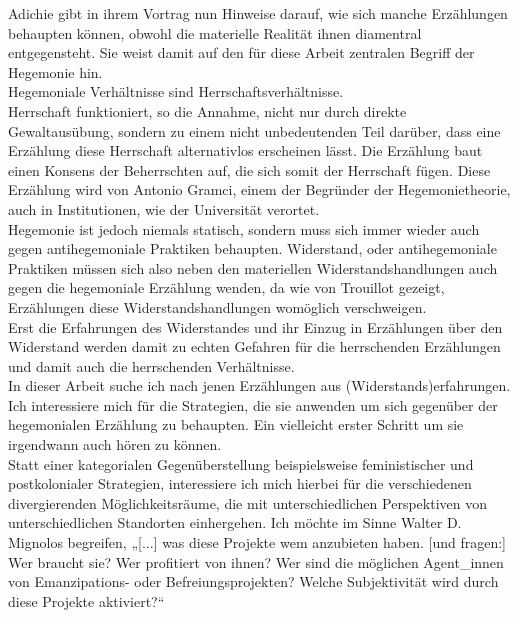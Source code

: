 Adichie gibt in ihrem Vortrag nun Hinweise darauf, wie sich manche
Erzählungen behaupten können, obwohl die materielle Realität ihnen diamentral
entgegensteht. Sie weist damit auf den für diese Arbeit zentralen Begriff der
Hegemonie hin.\\
Hegemoniale Verhältnisse sind
Herrschaftsverhältnisse.\footnotemark{}\\
Herrschaft
funktioniert, so die Annahme, nicht nur durch direkte Gewaltausübung, sondern
zu einem nicht unbedeutenden Teil darüber, dass eine Erzählung diese Herrschaft
alternativlos erscheinen lässt. Die Erzählung baut einen Konsens der
Beherrschten auf, die sich somit der Herrschaft fügen. Diese Erzählung wird von
Antonio Gramci, einem der Begründer der Hegemonietheorie, auch in
Institutionen, wie der Universität verortet.\\
Hegemonie ist jedoch niemals statisch, sondern muss sich immer wieder auch
gegen antihegemoniale Praktiken behaupten. Widerstand, oder antihegemoniale
Praktiken müssen sich also neben den materiellen Widerstandshandlungen auch
gegen die hegemoniale Erzählung wenden, da wie von Trouillot gezeigt,
Erzählungen diese Widerstandshandlungen womöglich verschweigen.\\
Erst die
Erfahrungen des Widerstandes und ihr Einzug in Erzählungen über den Widerstand
werden damit zu echten Gefahren für die herrschenden Erzählungen und damit auch
die herrschenden Verhältnisse.\\


\noindent In dieser Arbeit suche ich nach jenen Erzählungen aus (Widerstands)erfahrungen. Ich interessiere mich für die Strategien, die sie anwenden um sich gegenüber der hegemonialen Erzählung zu behaupten. Ein vielleicht erster Schritt um sie irgendwann auch hören zu können.\\  
Statt einer kategorialen Gegenüberstellung
beispielsweise feministischer und postkolonialer Strategien, interessiere ich mich hierbei
für die verschiedenen divergierenden Möglichkeitsräume, die mit
unterschiedlichen Perspektiven von unterschiedlichen Standorten einhergehen.
Ich möchte im Sinne Walter D. Mignolos begreifen, „[...] was diese Projekte wem
anzubieten haben. [und fragen:] Wer braucht sie? Wer profitiert von ihnen? Wer
sind die möglichen Agent\_innen von Emanzipations- oder Befreiungsprojekten?
Welche Subjektivität wird durch diese Projekte
aktiviert?“\footnotemark{}\\

